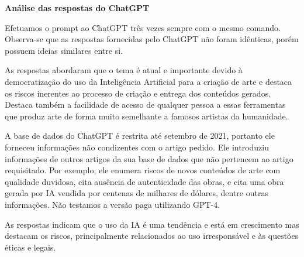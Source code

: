 
\vspace{0.3cm}

\textbf{Análise das respostas do ChatGPT}

\vspace{0.3cm}

Efetuamos o prompt ao ChatGPT três vezes sempre com o mesmo comando. Observa-se que as respostas fornecidas pelo ChatGPT não foram idênticas, porém possuem ideias similares entre si. 

As respostas abordaram que o tema é atual 
e importante devido à democratização do uso da Inteligência Artificial para a criação de arte e destaca os riscos inerentes 
ao processo de criação e entrega dos conteúdos gerados. Destaca também a facilidade de acesso de qualquer pessoa a essas ferramentas 
que produz arte de forma muito semelhante a famosos artistas da humanidade. 

A base de dados do ChatGPT é restrita até setembro de 2021, portanto ele forneceu informações não condizentes com o artigo pedido. Ele introduziu informações de outros artigos da sua base de dados que não pertencem ao artigo requisitado. Por exemplo, ele enumera riscos de novos conteúdos de arte com qualidade duvidosa, cita ausência de autenticidade das obras, e cita uma obra gerada por IA vendida por centenas de milhares de dólares, dentre outras informações. Não testamos a versão paga utilizando GPT-4.


As respostas indicam que o uso da IA é uma tendência e está em crescimento mas destacam os riscos, principalmente relacionados ao uso irresponsável e às questões éticas e legais.
 